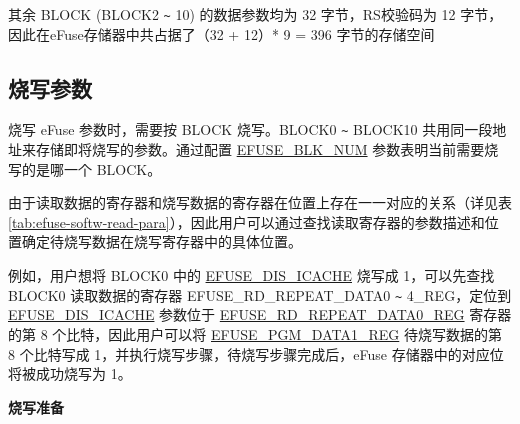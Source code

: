 \documentclass[main\_\_CN.tex]{subfiles}
\begin{document}
其余 BLOCK (BLOCK2 \verb+~+ 10) 的数据参数均为 32 字节，RS校验码为 12 字节，因此在eFuse存储器中共占据了（32 + 12）* 9 = 396 字节的存储空间

\subsection{烧写参数}
\label{sec:efuse-software-programming-para}


烧写 eFuse 参数时，需要按 BLOCK 烧写。BLOCK0 \verb+~+ BLOCK10 共用同一段地址来存储即将烧写的参数。通过配置 \hyperref[fielddesc:EFUSEBLKNUM]{EFUSE\_BLK\_NUM} 参数表明当前需要烧写的是哪一个 BLOCK。


由于读取数据的寄存器和烧写数据的寄存器在位置上存在一一对应的关系（详见表 \ref{tab:efuse-softw-read-para}），因此用户可以通过查找读取寄存器的参数描述和位置确定待烧写数据在烧写寄存器中的具体位置。

例如，用户想将 BLOCK0 中的 \hyperref[fielddesc:EFUSEDISICACHE]{EFUSE\_DIS\_ICACHE} 烧写成 1，可以先查找 BLOCK0 读取数据的寄存器 EFUSE\_RD\_REPEAT\_DATA0 \verb+~+ 4\_REG，定位到 \hyperref[fielddesc:EFUSEDISICACHE]{EFUSE\_DIS\_ICACHE} 参数位于 \hyperref[regdesc:EFUSERDREPEATDATA0REG]{EFUSE\_RD\_REPEAT\_DATA0\_REG} 寄存器的第 8 个比特，因此用户可以将 \hyperref[regdesc:EFUSEPGMDATA1REG]{EFUSE\_PGM\_DATA1\_REG} 待烧写数据的第 8 个比特写成 1，并执行烧写步骤，待烧写步骤完成后，eFuse 存储器中的对应位将被成功烧写为 1。

{\bfseries 烧写准备}
\end{document}
